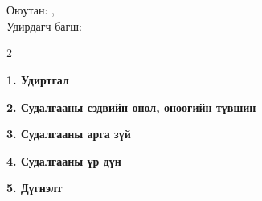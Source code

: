 \thispagestyle{plain}
\captionsetup{list=no}

\vspace*{-6mm}
\begin{center}
\textbf{\large \titlename}\\[1mm]
\end{center}

\begin{flushright}
\departmentname\\
Оюутан: \studentID, \authorShort\\
Удирдагч багш: \supervisorname
\end{flushright}

\vspace{1mm}
\setlength{\columnsep}{7mm}
\begin{multicols*}{2}
\sloppy

\noindent\textbf{1. Удиртгал}


\noindent\textbf{2. Судалгааны сэдвийн онол, өнөөгийн түвшин}


\noindent\textbf{3. Судалгааны арга зүй}


\noindent\textbf{4. Судалгааны үр дүн}


\noindent\textbf{5. Дүгнэлт}

\end{multicols*}
